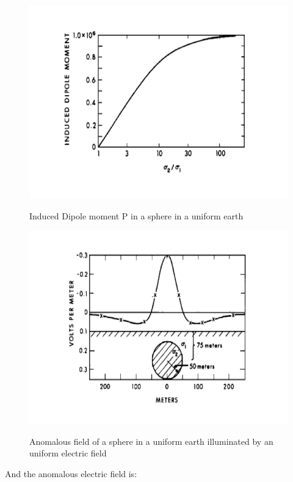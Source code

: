 \documentclass[11pt,letterpaper,leqno]{amsart}
\numberwithin{equation}{section}
\begin{document}
\begin{figure}[h]
\caption{Induced Dipole moment P in a sphere in a uniform earth}
\includegraphics[scale=0.4]{SphereInducedDipoleMoment.png}
\label{Induced Dipole}
\end{figure}



\begin{figure}[h]
\caption{Anomalous field of a sphere in a uniform earth illuminated by an uniform electric field}
\includegraphics[scale=0.4]{SphereAnomlousField.png}
\label{Anomalous Field}
\end{figure}

And the anomalous electric field is:
\end{document}
